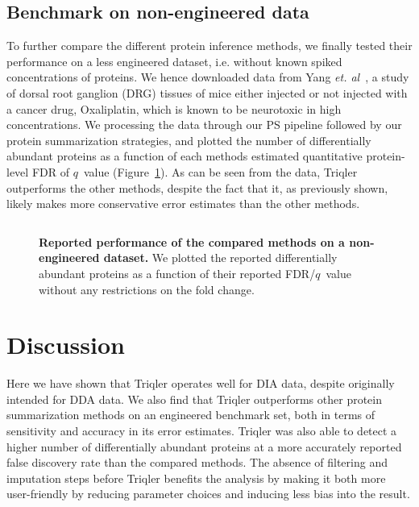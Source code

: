 \documentclass[10pt,letterpaper]{article}
\begin{document}

\subsection*{Benchmark on non-engineered data}

To further compare the different protein inference methods, we finally tested their performance on a less engineered dataset, i.e. without known spiked concentrations of proteins. We hence downloaded data from Yang {\em et. al}~\cite{YANG2022104682}, a study of dorsal root ganglion (DRG) tissues of mice either injected or not injected with a cancer drug, Oxaliplatin, which is known to be neurotoxic in high concentrations. We processing the data through our PS pipeline followed by our protein summarization strategies, and plotted the number of differentially abundant proteins as a function of each methods estimated quantitative protein-level FDR of $q$~value (Figure~\ref{fig:non-engineered}). As can be seen from the data, Triqler outperforms the other methods, despite the fact that it, as previously shown, likely makes more conservative error estimates than the other methods.


\begin{figure}[hbt]
    \centering
    \begin{tabular}{c} 
    \end{tabular}
  \caption{{\bf Reported performance of the compared methods on a non-engineered dataset.} We plotted the reported differentially abundant proteins as a function of their reported FDR/$q$~value without any restrictions on the fold change. \label{fig:non-engineered}}
\end{figure}


\section*{Discussion}

Here we have shown that Triqler operates well for DIA data, despite originally intended for DDA data. We also find that Triqler outperforms other protein summarization methods on an engineered benchmark set, both in terms of sensitivity and accuracy in its error estimates. Triqler was also able to detect a higher number of differentially abundant proteins at a more accurately reported false discovery rate than the compared methods. The absence of filtering and imputation steps before Triqler benefits the analysis by making it both more user-friendly by reducing parameter choices and inducing less bias into the result. 
\end{document}
